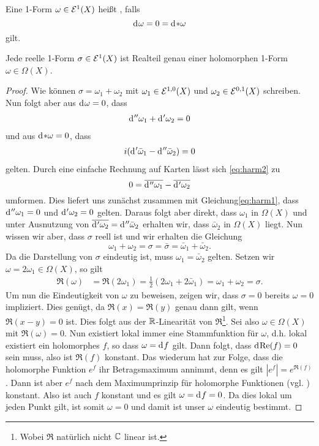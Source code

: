 \begin{defin}
  Eine 1-Form $\omega \in \mathcal{E}^1(X)$ heißt , falls
  \[
  \d[\omega] = 0 = \d[\ast \omega]
  \]
  gilt.
\end{defin}

\begin{thm}
  \label{thm:harm-form}
  Jede reelle 1-Form $\sigma \in \mathcal{E}^1(X)$ ist Realteil genau einer
  holomorphen 1-Form $\omega \in \Omega(X)$.
\end{thm}

\begin{proof}
  Wie können $\sigma = \omega_1 + \omega_2$ mit $\omega_1 \in
  \mathcal{E}^{1,0}(X)$ und $\omega_2 \in \mathcal{E}^{0,1}(X)$ schreiben. Nun
  folgt aber aus $\d[\omega] = 0$, dass
  \begin{align}
    \d[''\omega_1] + \d['\omega_2] = 0 \label{eq:harm1}
  \end{align}
  und aus $\d[\ast \omega] = 0$, dass
  \begin{align}
  i(\d['\bar \omega_1] - \d[''\bar \omega_2]) = 0 \label{eq:harm2}
  \end{align}
  gelten. Durch eine einfache
  Rechnung auf Karten lässt sich \eqref{eq:harm2} zu
  \[
  0 = \overline{\d[''\omega_1]} - \overline{\d['\omega_2]}
  \]
  umformen. Dies liefert uns zunächst zusammen mit
  Gleichung\eqref{eq:harm1}, dass $\d[''\omega_1] = 0$ und $\d['\omega_2] = 0$
  gelten. Daraus folgt aber direkt, dass $\omega_1$ in $\Omega(X)$
  und unter Ausnutzung von $\overline{\d['\omega_2]} = \d[''
  \bar \omega_2]$ erhalten wir, dass $\bar \omega_2$ in $\Omega(X)$
  liegt. Nun wissen wir aber, dass $\sigma$ reell ist und wir erhalten
  die Gleichung
  \[
  \omega_1 + \omega_2 = \sigma = \bar \sigma = \bar \omega_1 + \bar
  \omega_2.
  \]
  Da die Darstellung von $\sigma$ eindeutig ist, muss $\omega_1 =
  \bar \omega_2$ gelten. Setzen wir $\omega = 2\omega_1 \in
  \Omega(X)$, so gilt
  \begin{align*}
    \Re(\omega) & = \Re(2\omega_1) = \frac{1}{2}( 2 \omega_1 + 2 \bar
    \omega_1) = \omega_1 + \omega_2 = \sigma.
  \end{align*}
  Um nun die Eindeutigkeit von $\omega$ zu beweisen, zeigen wir, dass
  $\sigma = 0$ bereits $\omega = 0$ impliziert. Dies genügt, da
  $\Re(x) = \Re(y)$ genau dann gilt, wenn $\Re(x-y) = 0$ ist. Dies
  folgt aus der $\mathbb{R}$-Linearität von $\Re$\footnote{Wobei $\Re$
  natürlich nicht $\mathbb{C}$ linear ist.}. Sei also $\omega \in \Omega(X)$
  mit $\Re(\omega) = 0$. Nun existiert lokal immer eine
  Stammfunktion für $\omega$, d.h. lokal existiert ein holomorphes
  $f$, so dass $\omega = \d[f]$ gilt. Dann folgt, dass
  $\d[\Re(f)] = 0$ sein muss, also ist $\Re(f)$ konstant. Das wiederum
  hat zur Folge, dass die holomorphe Funktion $e^f$ ihr
  Betragsmaximum annimmt, denn es gilt $|e^f| = e^{\Re(f)}$. Dann ist
  aber $e^f$ nach dem Maximumprinzip für holomorphe Funktionen
  (vgl. \cite[Kor. 2.6]{For})
  konstant. Also ist auch $f$ konstant und es gilt $\omega = \d[f] =
  0$. Da dies lokal um jeden Punkt gilt, ist somit $\omega = 0$ und
  damit ist unser $\omega$ eindeutig bestimmt.
\end{proof}

